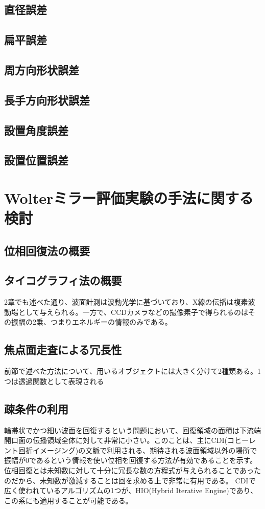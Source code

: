 \documentclass[dvipdfmx,autodetect-engine]{jreport}
\begin{document}
\section{直径誤差}

\section{扁平誤差}

\section{周方向形状誤差}

\section{長手方向形状誤差}

\section{設置角度誤差}

\section{設置位置誤差}

\newpage
\chapter{Wolterミラー評価実験の手法に関する検討}

\newpage
\section{位相回復法の概要}

\section{タイコグラフィ法の概要}
2章でも述べた通り、波面計測は波動光学に基づいており、X線の伝播は複素波動場として与えられる。一方で、CCDカメラなどの撮像素子で得られるのはその振幅の2乗、つまりエネルギーの情報のみである。

\section{焦点面走査による冗長性}
前節で述べた方法について、用いるオブジェクトには大きく分けて2種類ある。1つは透過関数として表現される

\section{疎条件の利用}
輪帯状でかつ細い波面を回復するという問題において、回復領域の面積は下流端開口面の伝播領域全体に対して非常に小さい。このことは、主にCDI(コヒーレント回折イメージング)の文脈で利用される、期待される波面領域以外の場所で振幅が0であるという情報を使い位相を回復する方法が有効であることを示す。位相回復とは未知数に対して十分に冗長な数の方程式が与えられることであったのだから、未知数が激減することは回を求める上で非常に有用である。
CDIで広く使われているアルゴリズムの1つが、HIO(Hybrid Iterative Engine)であり、この系にも適用することが可能である。
\end{document}
